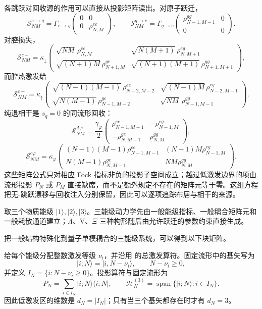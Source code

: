 各跳跃对回收源的作用可以直接从投影矩阵读出。对原子跃迁，
\[
\mathcal S_{NM}^{e\to g}
=\Gamma_{e\to g}
\begin{pmatrix}0&0\\0&\rho_{N,M}^{ee}\end{pmatrix},
\qquad
\mathcal S_{NM}^{g\to e}
=\Gamma_{g\to e}
\begin{pmatrix}\rho_{N-1,M-1}^{gg}&0\\0&0\end{pmatrix}.
\]
对腔损失，
\[
\mathcal S_{NM}^{c-}=\kappa_\downarrow
\begin{pmatrix}
\sqrt{NM}\,\rho_{N,M}^{ee}&\sqrt{N(M+1)}\,\rho_{N,M+1}^{eg}\\
\sqrt{(N+1)M}\,\rho_{N+1,M}^{ge}&\sqrt{(N+1)(M+1)}\,\rho_{N+1,M+1}^{gg}
\end{pmatrix},
\]
而腔热激发给
\[
\mathcal S_{NM}^{c+}=\kappa_\uparrow
\begin{pmatrix}
\sqrt{(N-1)(M-1)}\,\rho_{N-2,M-2}^{ee}&\sqrt{(N-1)M}\,\rho_{N-2,M-1}^{eg}\\
\sqrt{N(M-1)}\,\rho_{N-1,M-2}^{ge}&\sqrt{NM}\,\rho_{N-1,M-1}^{gg}
\end{pmatrix}.
\]
纯退相干是 $s_q=0$ 的同流形回收：
\[
\mathcal S_{NM}^{A\varphi}=\frac{\gamma_\varphi}{2}
\begin{pmatrix}
\rho_{N-1,M-1}^{ee}&-\rho_{N-1,M}^{eg}\\
-\rho_{N,M-1}^{ge}&\rho_{N,M}^{gg}
\end{pmatrix},
\]
\[
\mathcal S_{NM}^{c\varphi}=\kappa_\varphi
\begin{pmatrix}
(N-1)(M-1)\rho_{N-1,M-1}^{ee}&(N-1)M\rho_{N-1,M}^{eg}\\
N(M-1)\rho_{N,M-1}^{ge}&NM\rho_{N,M}^{gg}
\end{pmatrix}.
\]
这些矩阵公式只对相应 Fock 指标非负的投影子空间成立；越过低激发边界的项由流形投影 $P_N$ 或 $P_M$ 直接缺席，而不是额外规定不存在的矩阵元等于零。这组方程把无-跳跃漂移与回收注入分别保留，因此可以逐项追踪布居与相干的来源。

取三个物质能级 $|1\rangle,|2\rangle,|3\rangle$。三能级动力学先由一般能级指标、一般耦合矩阵元和一般耗散通道建立；$\Lambda$、V、$\Xi$ 三种构形随后由允许跃迁的参数约束直接生成。

把一般结构特殊化到量子单模耦合的三能级系统，可以得到以下块矩阵。

给每个能级分配整数激发等级 $\nu_i$，并沿用 的总激发算符。固定流形中的基矢写为
\[
|i;N\rangle=|i,N-\nu_i\rangle,
\qquad N-\nu_i\ge0,
\]
并定义 $I_N=\{i:N-\nu_i\ge0\}$。投影算符与固定流形为
\begin{equation}
P_N=\sum_{i\in I_N}|i;N\rangle\langle i;N|,
\qquad
\mathcal H_N^{(3)}=\operatorname{span}\{|i;N\rangle:i\in I_N\}.
\label{eq:phys-oqs-pn-three}
\end{equation}
因此低激发区的维数是 $d_N=|I_N|$；只有当三个基矢都存在时才有 $d_N=3$。

